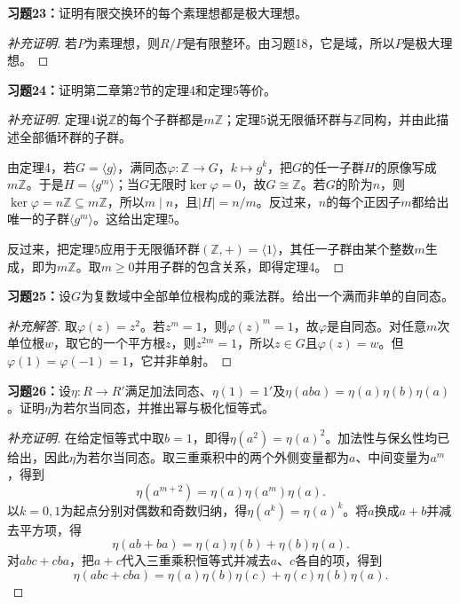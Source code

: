 \begin{problem}
\textbf{习题23：}证明有限交换环的每个素理想都是极大理想。
\end{problem}
\begin{proof}[补充证明]
若$P$为素理想，则$R/P$是有限整环。由习题18，它是域，所以$P$是极大理想。
\end{proof}

\begin{problem}
\textbf{习题24：}证明第二章第2节的定理4和定理5等价。
\end{problem}
\begin{proof}[补充证明]
定理4说$\mathbb Z$的每个子群都是$m\mathbb Z$；定理5说无限循环群与$\mathbb Z$同构，并由此描述全部循环群的子群。

由定理4，若$G=\langle g\rangle$，满同态$\varphi:\mathbb Z\to G$，$k\mapsto g^k$，把$G$的任一子群$H$的原像写成$m\mathbb Z$。于是$H=\langle g^m\rangle$；当$G$无限时$\ker\varphi=0$，故$G\cong\mathbb Z$。若$G$的阶为$n$，则$\ker\varphi=n\mathbb Z\subseteq m\mathbb Z$，所以$m\mid n$，且$|H|=n/m$。反过来，$n$的每个正因子$m$都给出唯一的子群$\langle g^m\rangle$。这给出定理5。

反过来，把定理5应用于无限循环群$(\mathbb Z,+)=\langle1\rangle$，其任一子群由某个整数$m$生成，即为$m\mathbb Z$。取$m\geqslant0$并用子群的包含关系，即得定理4。
\end{proof}

\begin{problem}
\textbf{习题25：}设$G$为复数域中全部单位根构成的乘法群。给出一个满而非单的自同态。
\end{problem}
\begin{proof}[补充解答]
取$\varphi(z)=z^2$。若$z^m=1$，则$\varphi(z)^m=1$，故$\varphi$是自同态。对任意$m$次单位根$w$，取它的一个平方根$z$，则$z^{2m}=1$，所以$z\in G$且$\varphi(z)=w$。但$\varphi(1)=\varphi(-1)=1$，它并非单射。
\end{proof}

\begin{problem}
\textbf{习题26：}设$\eta:R\to R'$满足加法同态、$\eta(1)=1'$及$\eta(aba)=\eta(a)\eta(b)\eta(a)$。证明$\eta$为若尔当同态，并推出幂与极化恒等式。
\end{problem}
\begin{proof}[补充证明]
在给定恒等式中取$b=1$，即得$\eta(a^2)=\eta(a)^2$。加法性与保幺性均已给出，因此$\eta$为若尔当同态。取三重乘积中的两个外侧变量都为$a$、中间变量为$a^m$，得到
\[
\eta(a^{m+2})=\eta(a)\eta(a^m)\eta(a).
\]
以$k=0,1$为起点分别对偶数和奇数归纳，得$\eta(a^k)=\eta(a)^k$。将$a$换成$a+b$并减去平方项，得
\[
\eta(ab+ba)=\eta(a)\eta(b)+\eta(b)\eta(a).
\]
对$abc+cba$，把$a+c$代入三重乘积恒等式并减去$a$、$c$各自的项，得到
\[
\eta(abc+cba)=\eta(a)\eta(b)\eta(c)+\eta(c)\eta(b)\eta(a).
\]
\end{proof}

